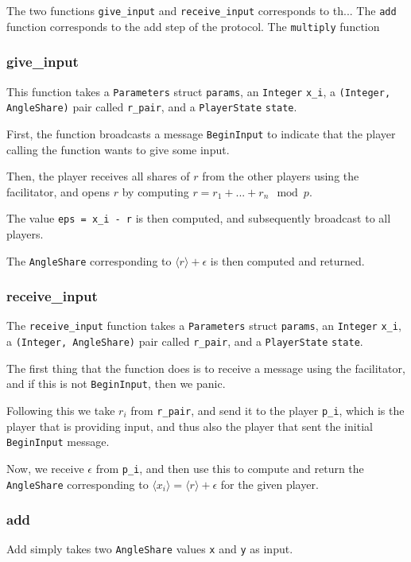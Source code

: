 \documentclass[../main.tex]{subfiles}
\begin{document}
The two functions \lstinline{give_input} and \lstinline{receive_input} corresponds to th...
The \lstinline{add} function corresponds to the add step of the protocol.
The \lstinline{multiply} function

\subsubsection{give\_input}
This function takes a \lstinline{Parameters} struct \lstinline{params}, an \lstinline{Integer} \lstinline{x_i}, a \lstinline{(Integer, AngleShare)} pair called \lstinline{r_pair}, and a \lstinline{PlayerState} \lstinline{state}.

First, the function broadcasts a message \lstinline{BeginInput} to indicate that the player calling the function wants to give some input.

Then, the player receives all shares of $r$ from the other players using the facilitator, and opens $r$ by computing $r = r_1 + ... + r_n \mod p$.

The value \lstinline{eps = x_i - r} is then computed, and subsequently broadcast to all players.

The \lstinline{AngleShare} corresponding to $\langle r \rangle + \epsilon$ is then computed and returned.
\subsubsection{receive\_input}
The \lstinline{receive_input} function takes a \lstinline{Parameters} struct \lstinline{params}, an \lstinline{Integer} \lstinline{x_i}, a \lstinline{(Integer, AngleShare)} pair called \lstinline{r_pair}, and a \lstinline{PlayerState} \lstinline{state}.

The first thing that the function does is to receive a message using the facilitator, and if this is not \lstinline{BeginInput}, then we panic.

Following this we take $r_i$ from \lstinline{r_pair}, and send it to the player \lstinline{p_i}, which is the player that is providing input, and thus also the player that sent the initial \lstinline{BeginInput} message.

Now, we receive $\epsilon$ from \lstinline{p_i}, and then use this to compute and return the \lstinline{AngleShare} corresponding to $\langle x_i \rangle = \langle r \rangle + \epsilon$ for the given player.

\subsubsection{add}
Add simply takes two \lstinline{AngleShare} values \lstinline{x} and \lstinline{y} as input.
\end{document}
